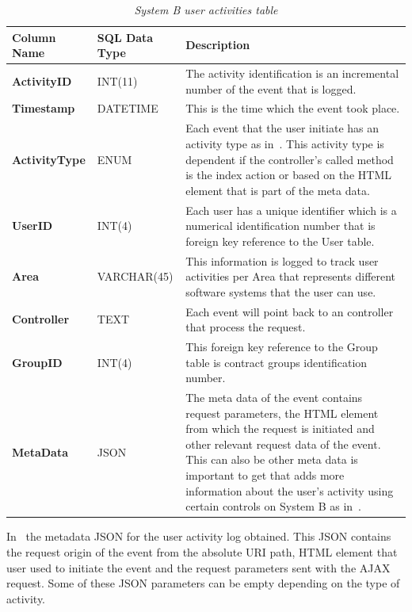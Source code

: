 \begin{table}[!htb]
	\centering
	\small
	\caption[System B user activities table]
	{\textit{System B user activities table}}
	\label{tbl:CH2_SystemB_LoggingTable}
	\begin{tabularx}{\textwidth}{|l|l|X|}
		\hline \textbf{Column Name} & \textbf{SQL Data Type} & \textbf{Description} \\
		\hline \textbf{ActivityID} & INT(11) & The activity identification is an incremental number of the event that is logged.\\
		\hline \textbf{Timestamp} & DATETIME & This is the time which the event took place.\\
		\hline \textbf{ActivityType} & ENUM & Each event that the user initiate has an activity type as in~\Cref{tbl:Ch2_SystemB_ActivityTypes}. This activity type is dependent if the controller's called method is the index action or based on the HTML element that is part of the meta data. \\
		\hline \textbf{UserID} & INT(4) & Each user has a unique identifier which is a numerical identification number that is foreign key reference to the User table. \\
		\hline \textbf{Area} & VARCHAR(45) & This information is logged to track user activities per Area that represents different software systems that the user can use. \\
		\hline \textbf{Controller} & TEXT & Each event will point back to an controller that process the request. \\
		\hline \textbf{GroupID} & INT(4) & This foreign key reference to the Group table is contract groups identification number. \\
		\hline \textbf{MetaData} & JSON & The meta data of the event contains request parameters, the HTML element from which the request is initiated and other relevant request data of the event. This can also be other meta data is important to get that adds more information about the user's activity using certain controls on System B as in~\Cref{fig:CH2_SystemBMetaData}. \\
		\hline
	\end{tabularx}
\end{table}

In~ the metadata JSON for the user activity log obtained. This JSON contains the request origin of the event from the absolute URI path, HTML element that user used to initiate the event and the request parameters sent with the AJAX request. Some of these JSON parameters can be empty depending on the type of activity.

